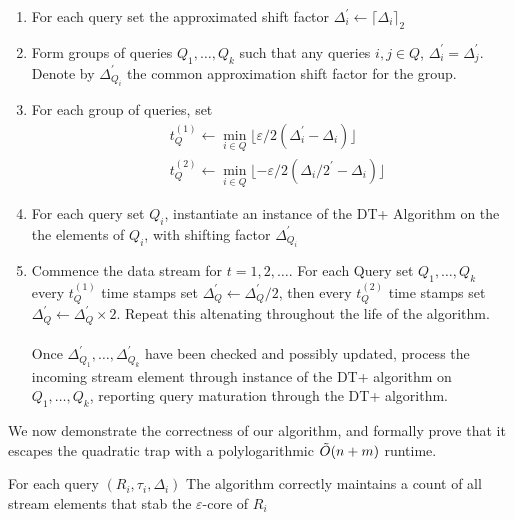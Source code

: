 \begin{enumerate}
    \item For each query set the approximated shift factor $\Delta_i^\prime \leftarrow \lceil\Delta_i\rceil_2$

    \item Form groups of queries $Q_1, \dots, Q_k$ such that any queries $i,j\in Q$, $\Delta_i^\prime = \Delta_j^\prime$. Denote by $\Delta^\prime_{Q_i}$ the common approximation shift factor for the group.

    \item For each group of queries, set 
    \begin{align*}
        & t^{(1)}_{Q} \leftarrow \min_{i\in Q} \lfloor\varepsilon/2(\Delta_i^\prime - \Delta_i) \rfloor \\
        & t^{(2)}_{Q} \leftarrow \min_{i\in Q} \lfloor-\varepsilon/2(\Delta_i/2^\prime - \Delta_i)\rfloor
    \end{align*}

    \item For each query set $Q_i$, instantiate an instance of the DT+ Algorithm on the the elements of $Q_i$, with shifting factor $\Delta^\prime_{Q_i}$

    \item Commence the data stream for $t=1,2,\dots$. For each Query set $Q_1,\dots,Q_k$ every $t_Q^{(1)}$ time stamps set $\Delta_Q^\prime \leftarrow \Delta_Q^\prime / 2$, then every $t_Q^{(2)}$ time stamps set $\Delta_Q^\prime \leftarrow \Delta_Q^\prime \times 2$. Repeat this altenating throughout the life of the algorithm. \\
    \\
    Once $\Delta^\prime_{Q_1}, \dots, \Delta^\prime_{Q_k}$ have been checked and possibly updated, process the incoming stream element through instance of the DT+ algorithm on $Q_1, \dots, Q_k$, reporting query maturation through the DT+ algorithm.
\end{enumerate}

We now demonstrate the correctness of our algorithm, and formally prove that it escapes the quadratic trap with a polylogarithmic $\Tilde{O}(n+m)$ runtime. 

\begin{lemma}[Correctness ]For each query $(R_i, \tau_i, \Delta_i)$ The algorithm correctly maintains a count of all stream elements that stab the $\varepsilon$-core of $R_i$
    
\end{lemma}

